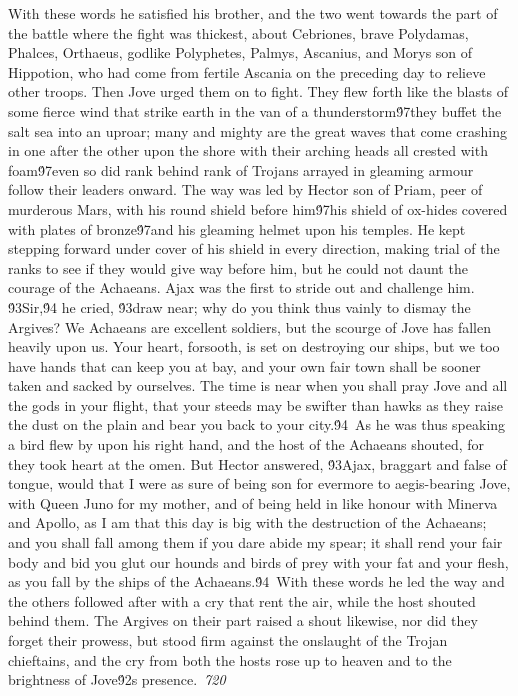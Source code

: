 {With these words he satisfied his brother, and the two went towards the part of the battle where the fight was thickest, about Cebriones, brave Polydamas, Phalces, Orthaeus, godlike Polyphetes, Palmys, Ascanius, and Morys son of Hippotion, who had come from fertile Ascania on the preceding day to relieve other troops. Then Jove urged them on to fight. They flew forth like the blasts of some fierce wind that strike earth in the van of a thunderstorm\'97they buffet the salt sea into an uproar; many and mighty are the great waves that come crashing in one after the other upon the shore with their arching heads all crested with foam\'97even so did rank behind rank of Trojans arrayed in gleaming armour follow their leaders onward. The way was led by Hector son of Priam, peer of murderous Mars, with his round shield before him\'97his shield of ox-hides covered with plates of bronze\'97and his gleaming helmet upon his temples. He kept stepping forward under cover of his shield in every direction, making trial of the ranks to see if they would give way before him, but he could not daunt the courage of the Achaeans. Ajax was the first to stride out and challenge him. \'93Sir,\'94 he cried, \'93draw near; why do you think thus vainly to dismay the Argives? We Achaeans are excellent soldiers, but the scourge of Jove has fallen heavily upon us. Your heart, forsooth, is set on destroying our ships, but we too have hands that can keep you at bay, and your own fair town shall be sooner taken and sacked by ourselves. The time is near when you shall pray Jove and all the gods in your flight, that your steeds may be swifter than hawks as they raise the dust on the plain and bear you back to your city.\'94\
As he was thus speaking a bird flew by upon his right hand, and the host of the Achaeans shouted, for they took heart at the omen. But Hector answered, \'93Ajax, braggart and false of tongue, would that I were as sure of being son for evermore to aegis-bearing Jove, with Queen Juno for my mother, and of being held in like honour with Minerva and Apollo, as I am that this day is big with the destruction of the Achaeans; and you shall fall among them if you dare abide my spear; it shall rend your fair body and bid you glut our hounds and birds of prey with your fat and your flesh, as you fall by the ships of the Achaeans.\'94\
With these words he led the way and the others followed after with a cry that rent the air, while the host shouted behind them. The Argives on their part raised a shout likewise, nor did they forget their prowess, but stood firm against the onslaught of the Trojan chieftains, and the cry from both the hosts rose up to heaven and to the brightness of Jove\'92s presence.\
\pard{}\sl720\qc{}

}
